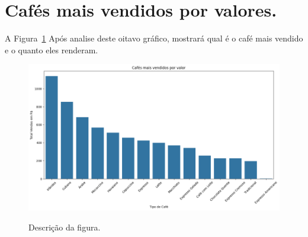 \section{Cafés mais vendidos por valores.}
\label{sec:figura}
A Figura~\ref{figuras/Cafe-mais-vendido-valor.png} Após analise deste oitavo gráfico, mostrará qual é o café mais vendido e o quanto eles renderam.
\begin{figure}[!ht]
	{\centering
		\caption{Descrição da figura.}
		\includegraphics[width=1.0\textwidth]{figuras/Cafe-mais-vendido-valor.png}
		\label{figuras/Cafe-mais-vendido-valor.png}
	}
\end{figure} \\ \\ \\ \\ \\ \\ \\ \\ \\ \\ \\ \\ \\ 

